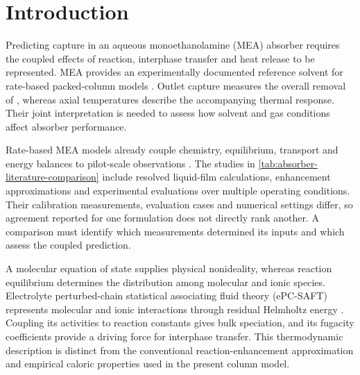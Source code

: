 \section{Introduction}\label{sec:introduction}
Predicting \COtwo{} capture in an aqueous monoethanolamine (MEA) absorber requires the coupled effects of reaction, interphase transfer and heat release to be represented.
MEA provides an experimentally documented reference solvent for rate-based packed-column models \cite{Freguia2003,Mores2012,Zhang2009}.
Outlet capture measures the overall removal of \COtwo, whereas axial temperatures describe the accompanying thermal response.
Their joint interpretation is needed to assess how solvent and gas conditions affect absorber performance.

Rate-based MEA models already couple chemistry, equilibrium, transport and energy balances to pilot-scale observations \cite{Razi2013,Chinen2018,Morgan2018,Morgan2020}.
The studies in \cref{tab:absorber-literature-comparison} include resolved liquid-film calculations, enhancement approximations and experimental evaluations over multiple operating conditions.
Their calibration measurements, evaluation cases and numerical settings differ, so agreement reported for one formulation does not directly rank another.
A comparison must identify which measurements determined its inputs and which assess the coupled prediction.



A molecular equation of state supplies physical nonideality, whereas reaction equilibrium determines the distribution among molecular and ionic species.
Electrolyte perturbed-chain statistical associating fluid theory (ePC-SAFT) represents molecular and ionic interactions through residual Helmholtz energy \cite{Gross2001,Cameretti2005,Bulow2021a}.
Coupling its activities to reaction constants gives bulk speciation, and its fugacity coefficients provide a \COtwo{} driving force for interphase transfer.
This thermodynamic description is distinct from the conventional reaction-enhancement approximation and empirical caloric properties used in the present column model.

